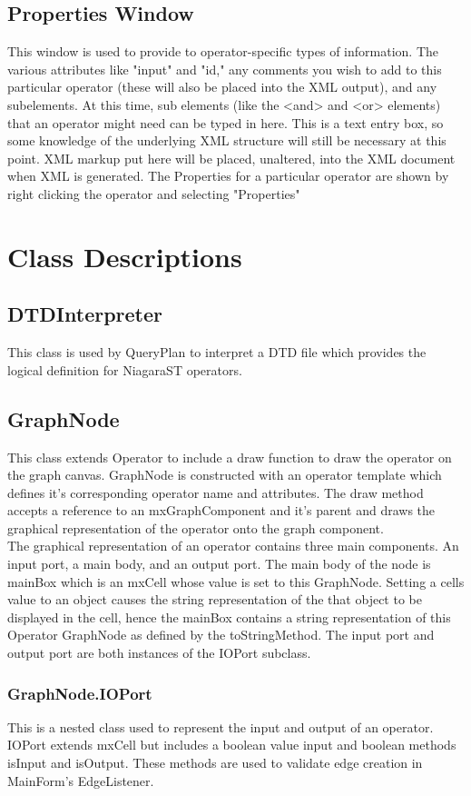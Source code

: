 \documentclass{article}
\begin{document}
\subsection{Properties Window} This window is used to provide to operator-specific types of information.  The various attributes like "input" and "id," any comments you wish to add to this particular operator (these will also be placed into the XML output), and any subelements.  At this time, sub elements (like the <and> and <or> elements) that an operator might need can be typed in here.  This is a text entry box, so some knowledge of the underlying XML structure will still be necessary at this point.  XML markup put here will be placed, unaltered, into the XML document when XML is generated. The Properties for a particular operator are shown by right clicking the operator and selecting "Properties"
\section{Class Descriptions}
\subsection{DTDInterpreter} This class is used by QueryPlan to interpret a DTD file which provides the logical definition for NiagaraST operators.
\subsection{GraphNode} This class extends Operator to include a draw function to draw the operator on the graph canvas.  GraphNode is constructed with an operator template which defines it's corresponding operator name and attributes.  The draw method accepts a reference to an mxGraphComponent and it's parent and draws the graphical representation of the operator onto the graph component.\\
The graphical representation of an operator contains three main components.  An input port, a main body, and an output port.  The main body of the node is mainBox which is an mxCell whose value is set to this GraphNode.  Setting a cells value to an object causes the string representation of the that object to be displayed in the cell, hence the mainBox contains a string representation of this Operator GraphNode as defined by the toStringMethod.  The input port and output port are both instances of the IOPort subclass.
\subsubsection{GraphNode.IOPort} This is a nested class used to represent the input and output of an operator.  IOPort extends mxCell but includes a boolean value input and boolean methods isInput and isOutput.  These methods are used to validate edge creation in MainForm's EdgeListener.
\end{document}
